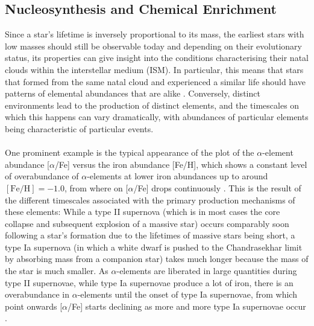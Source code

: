 \documentclass[a4paper,11pt]{article}
\begin{document}
\subsection{Nucleosynthesis and Chemical Enrichment} \label{nucleosynthesis}
Since a star's lifetime is inversely proportional to its mass, the earliest stars with low masses should still be observable today and depending on their evolutionary status, its properties can give insight into the conditions characterising their natal clouds within the interstellar medium (ISM). In particular, this means that stars that formed from the same natal cloud and experienced a similar life should have patterns of elemental abundances that are alike \citep{frebel15,freeman02}. Conversely, distinct environments lead to the production of distinct elements, and the timescales on which this happens can vary dramatically, with abundances of particular elements being characteristic of particular events.\\ \\
%
One prominent example is the typical appearance of the plot of the $\alpha$-element abundance [$\alpha$/Fe] versus the iron abundance [Fe/H], which shows a constant level of overabundance of $\alpha$-elements at lower iron abundances up to around $\mathrm{[Fe/H]}=-1.0$, from where on [$\alpha$/Fe] drops continuously \citep[e.g.][]{lee11,bensby07}. This is the result of the different timescales associated with the primary production mechanisms of these elements: While a type II supernova (which is in most cases the core collapse and subsequent explosion of a massive star) occurs comparably soon following a star's formation due to the lifetimes of massive stars being short, a type Ia supernova (in which a white dwarf is pushed to the Chandrasekhar limit by absorbing mass from a companion star) takes much longer because the mass of the star is much smaller. As $\alpha$-elements are liberated in large quantities during type II supernovae, while type Ia supernovae produce a lot of iron, there is an overabundance in $\alpha$-elements until the onset of type Ia supernovae, from which point onwards [$\alpha$/Fe] starts declining as more and more type Ia supernovae occur \citep{mcwilliam97,nissen10}.\\ \\
%
\end{document}
